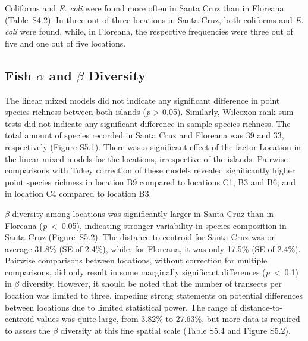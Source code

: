 \documentclass[jmse,article,accept,moreauthors,pdftex]{Definitions/mdpi}
\begin{document}
Coliforms and \textit{E. coli} were found more often in Santa Cruz than in Floreana (\mbox{Table S4.2}). In three out of three locations in Santa Cruz, both coliforms and \textit{E. coli} were found, while, in Floreana, the respective frequencies were three out of five and one out of five locations. 

\FloatBarrier

\subsection{Fish $\alpha$ and $\beta$ Diversity}

The linear mixed models did not indicate any significant difference in point species richness between both islands (\textit{p} > 0.05). Similarly, Wilcoxon rank sum tests did not indicate any significant difference in sample species richness. The total amount of species recorded in Santa Cruz and Floreana was 39 and 33, respectively (Figure S5.1). There was a significant effect of the factor Location in the linear mixed models for the locations, irrespective of the islands. Pairwise comparisons with Tukey correction of these models revealed significantly higher point species richness in location B9 compared to locations C1, B3 and B6; and in location C4 compared to location B3. 

$\beta$ diversity among locations was significantly larger in Santa Cruz than in Floreana \mbox{(\textit{p} < 0.05)}, indicating stronger variability in species composition in Santa Cruz (\mbox{Figure S5.2}). The distance-to-centroid for Santa Cruz was on average 31.8\% (SE of 2.4\%), while, for Floreana, it was only 17.5\% (SE of 2.4\%). Pairwise comparisons between locations, without correction for multiple comparisons, did only result in some marginally significant differences (\mbox{\textit{p} < 0.1}) in $\beta$ diversity. However, it should be noted that the number of transects per location was limited to three, impeding strong statements on potential differences between locations due to limited statistical power. The range of distance-to-centroid values was quite large, from 3.82\% to 27.63\%, but more data is required to assess the $\beta$ diversity at this fine spatial scale (Table S5.4 and Figure S5.2).
\end{document}

